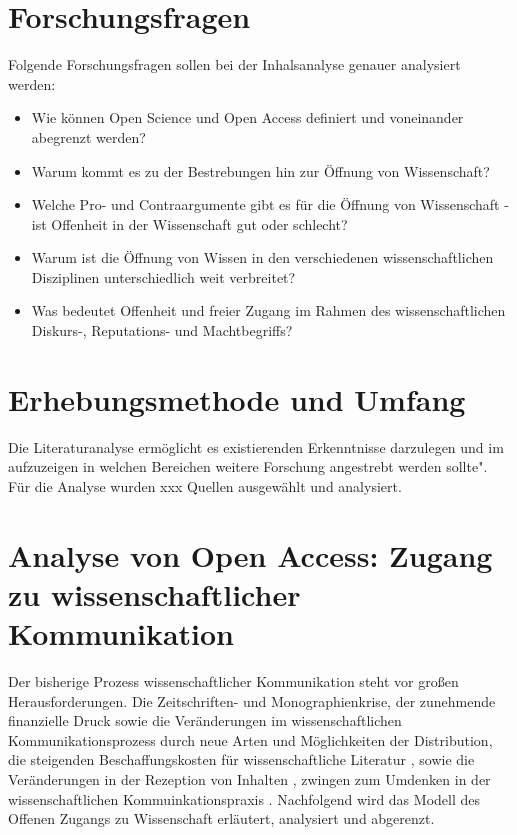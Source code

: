 \section{Forschungsfragen} 
Folgende Forschungsfragen sollen bei der Inhalsanalyse genauer analysiert werden:
\begin{itemize}
\item Wie können Open Science und Open Access definiert und voneinander abegrenzt werden? 
\item Warum kommt es zu der Bestrebungen hin zur Öffnung von Wissenschaft? 
\item Welche Pro- und Contraargumente gibt es für die Öffnung von Wissenschaft - ist Offenheit in der Wissenschaft gut oder schlecht? 
\item Warum ist die Öffnung von Wissen in den verschiedenen wissenschaftlichen Disziplinen unterschiedlich weit verbreitet? 
\item Was bedeutet Offenheit und freier Zugang im Rahmen des wissenschaftlichen Diskurs-, Reputations- und Machtbegriffs?
\end{itemize}	

\section{Erhebungsmethode und Umfang} 

Die Literaturanalyse ermöglicht es existierenden Erkenntnisse darzulegen und im aufzuzeigen in welchen Bereichen weitere Forschung angestrebt werden sollte"\cite{webster2002analyzing}. Für die Analyse wurden xxx Quellen ausgewählt und analysiert.

\section{Analyse von Open Access: Zugang zu wissenschaftlicher Kommunikation} 

Der bisherige Prozess wissenschaftlicher Kommunikation steht vor großen Herausforderungen. Die Zeitschriften- und Monographienkrise, der zunehmende finanzielle Druck sowie die Veränderungen im wissenschaftlichen Kommunikationsprozess durch neue Arten und Möglichkeiten der Distribution, die steigenden Beschaffungskosten für wissenschaftliche Literatur \cite{cite:17}, sowie die Veränderungen in der Rezeption von Inhalten \cite{holub_2013_reception}, zwingen zum Umdenken in der wissenschaftlichen Kommuinkationspraxis \cite{suchen}. Nachfolgend wird das Modell des Offenen Zugangs zu Wissenschaft erläutert, analysiert und abgerenzt.

